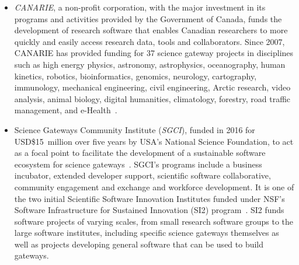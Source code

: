 \documentclass[review]{elsarticle}
\begin{document}
\begin{itemize}

\item \emph{CANARIE}, a non-profit corporation, with the major investment in its programs and activities provided by the Government of Canada, funds the development of research software that enables Canadian researchers to more quickly and easily access research data, tools and collaborators. Since 2007, CANARIE has provided funding for 37 science gateway projects in disciplines such as high energy physics, astronomy, astrophysics, oceanography, human kinetics, robotics, bioinformatics, genomics, neurology, cartography, immunology, mechanical engineering, civil engineering, Arctic research, video analysis, animal biology, digital humanities, climatology, forestry, road traffic management, and e-Health~\cite{canarie-15}. 

\item Science Gateways Community Institute (\emph{SGCI}), funded in 2016 for \mbox{USD\$15 million} over five years by USA's National Science Foundation, to act as a focal point to facilitate the development of a sustainable software ecosystem for science gateways~\cite{sgci-16}. SGCI's programs include a business incubator, extended developer support, scientific software collaborative, community engagement and exchange and workforce development. It is one of the two initial Scientific Software Innovation Institutes funded under NSF's Software Infrastructure for Sustained Innovation (SI2) program~\cite{nsf-si-17}. SI2 funds software projects of varying scales, from small research software groups to the large software institutes, including specific science gateways themselves as well as projects developing general software that can be used to build gateways. 


\end{itemize}
\end{document}
